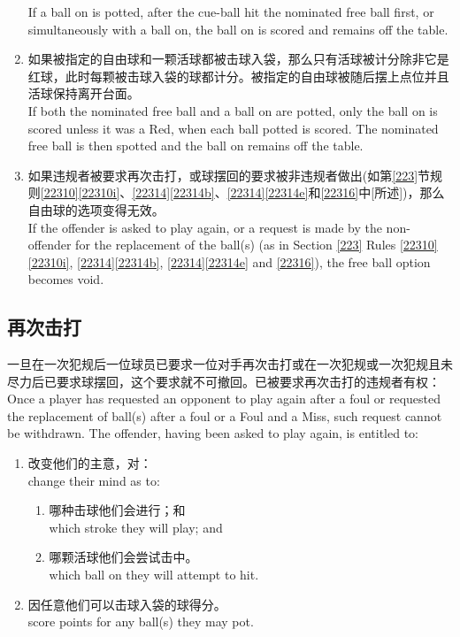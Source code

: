 \begin{enumerate}[label=(\alph*)]
    If a ball on is potted, after the cue-ball hit the nominated free ball first, or simultaneously with a ball on, the ball on is scored and remains off the table.
    \item 如果被指定的自由球和一颗活球都被击球入袋，那么只有活球被计分除非它是红球，此时每颗被击球入袋的球都计分。被指定的自由球被随后摆上点位并且活球保持离开台面。\\
    If both the nominated free ball and a ball on are potted, only the ball on is scored unless it was a Red, when each ball potted is scored. The nominated free ball is then spotted and the ball on remains off the table.
    \item 如果违规者被要求再次击打，或球摆回的要求被非违规者做出(如第\ref{223}节规则\ref{22310}\ref{22310i}、\ref{22314}\ref{22314b}、\ref{22314}\ref{22314e}和\ref{22316}中[所述])，那么自由球的选项变得无效。\\
    If the offender is asked to play again, or a request is made by the non-offender for the replacement of the ball(s) (as in Section \ref{223} Rules \ref{22310}\ref{22310i}, \ref{22314}\ref{22314b}, \ref{22314}\ref{22314e} and \ref{22316}), the free ball option becomes void.
\end{enumerate}

\subsection{再次击打}

\noindent 一旦在一次犯规后一位球员已要求一位对手再次击打或在一次犯规或一次犯规且未尽力后已要求球摆回，这个要求就不可撤回。已被要求再次击打的违规者有权：\\
Once a player has requested an opponent to play again after a foul or requested the replacement of ball(s) after a foul or a Foul and a Miss, such request cannot be withdrawn. The offender, having been asked to play again, is entitled to:
\begin{enumerate}[label=(\alph*)]
    \item 改变他们的主意，对：\\
    change their mind as to:
    \begin{enumerate}[label=(\roman*)]
        \item 哪种击球他们会进行；和\\
        which stroke they will play; and
        \item 哪颗活球他们会尝试击中。\\
        which ball on they will attempt to hit.
    \end{enumerate}
    \item 因任意他们可以击球入袋的球得分。\\
    score points for any ball(s) they may pot.
\end{enumerate}

